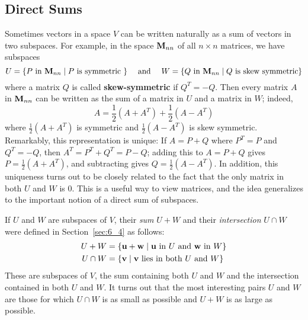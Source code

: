 \subsection*{Direct Sums}

Sometimes vectors in a space $V$ can be written naturally as a sum of vectors in two subspaces. For example, in the space $\textbf{M}_{nn}$ of all $n \times n$ matrices, we have subspaces
\begin{equation*}
U = \{P \mbox{ in } \textbf{M}_{nn} \mid P \mbox{ is symmetric } \} \quad \mbox{ and } \quad W = \{Q \mbox{ in } \textbf{M}_{nn} \mid Q \mbox{ is skew symmetric} \}
\end{equation*}
where a matrix $Q$ is called \textbf{skew-symmetric} if $Q^{T} = -Q$. Then every matrix $A$ in $\textbf{M}_{nn}$ can be written as the sum of a matrix in $U$ and a matrix in $W$; indeed,
\begin{equation*}
A = \frac{1}{2}(A + A^T) + \frac{1}{2}(A - A^T)
\end{equation*}
where $\frac{1}{2}(A + A^T)$ is symmetric and $\frac{1}{2}(A - A^T)$ is skew symmetric. Remarkably, this representation is unique: If $A = P + Q$ where $P^{T} = P$ and $Q^{T} = -Q$, then $A^{T} = P^{T} + Q^{T} = P - Q$; adding this to $A = P + Q$ gives $P = \frac{1}{2}(A + A^T)$, and subtracting gives $Q = \frac{1}{2}(A - A^{T})$. In addition, this uniqueness turns out to be closely related to the fact that the only matrix in both $U$ and $W$ is $0$. This is a useful way to view matrices, and the idea generalizes to the important notion of a direct sum of subspaces.


If $U$ and $W$ are subspaces of $V$, their \textit{sum} $U + W$ and their \textit{intersection} $U \cap W$ were defined in Section~\ref{sec:6_4} as follows:
\begin{align*}
U + W & = \{ \textbf{u} + \textbf{w} \mid \textbf{u} \mbox{ in } U \mbox{ and } \textbf{w} \mbox{ in } W \} \\
U \cap W & = \{ \textbf{v} \mid \textbf{v} \mbox{ lies in both } U \mbox{ and } W \}
\end{align*}
These are subspaces of $V$, the sum containing both $U$ and $W$ and the intersection contained in both $U$ and $W$. It turns out that the most interesting pairs $U$ and $W$ are those for which $U \cap W$ is as small as possible and $U + W$ is as large as possible.


